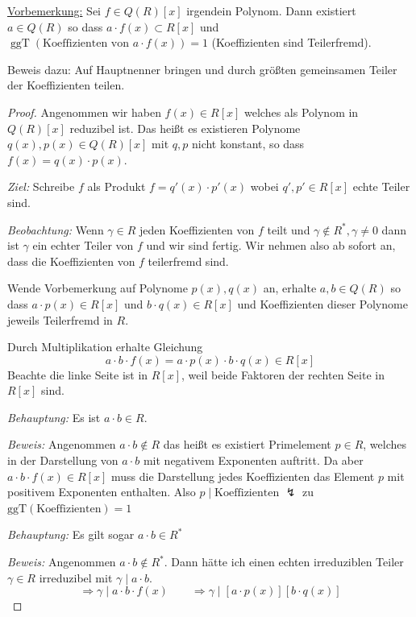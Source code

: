 \documentclass[12pt,parskip=full]{scrartcl}
\newcommand{\heading}{\underline}
\theoremstyle{definition}
\theoremstyle{remark}
\begin{document}
	\heading{Vorbemerkung:} Sei $f \in Q(R)[x]$ irgendein Polynom. Dann existiert $a \in Q(R)$ so dass $a \cdot f(x) \subset R[x]$ und $\operatorname{ggT}(\text{Koeffizienten von } a \cdot f(x)) = 1$ (Koeffizienten sind Teilerfremd).
	
	Beweis dazu: Auf Hauptnenner bringen und durch größten gemeinsamen Teiler der Koeffizienten teilen.
	
	\begin{proof}
		Angenommen wir haben $f(x) \in R[x]$ welches als Polynom in $Q(R)[x]$ reduzibel ist. Das heißt es existieren Polynome $q(x), p(x) \in Q(R)[x]$ mit $q,p$ nicht konstant, so dass $f(x) = q(x) \cdot p(x)$.
		
		\textit{Ziel:} Schreibe $f$ als Produkt $f = q'(x) \cdot p'(x)$ wobei $q',p' \in R[x]$ echte Teiler sind.
		
		\textit{Beobachtung:} Wenn $\gamma \in R$ jeden Koeffizienten von $f$ teilt und $\gamma \notin R^*, \gamma \neq 0$ dann ist $\gamma$ ein echter Teiler von $f$ und wir sind fertig. Wir nehmen also ab sofort an, dass die Koeffizienten von $f$ teilerfremd sind.
		
		Wende Vorbemerkung auf Polynome $p(x), q(x)$ an, erhalte $a,b \in Q(R)$ so dass $a \cdot p(x) \in R[x]$ und $b \cdot q(x) \in R[x]$ und Koeffizienten dieser Polynome jeweils Teilerfremd in $R$.
		
		Durch Multiplikation erhalte Gleichung
		\begin{equation*}
			a \cdot b \cdot f(x) = a \cdot p(x) \cdot b \cdot q(x) \in R[x] \tag{$*$}
		\end{equation*}
		Beachte die linke Seite ist in $R[x]$, weil beide Faktoren der rechten Seite in $R[x]$ sind.
		
		\textit{Behauptung:} Es ist $a \cdot b \in R$.
		
		\textit{Beweis:} Angenommen $a \cdot b \notin R$ das heißt es existiert Primelement $p \in R$, welches in der Darstellung von $a \cdot b$ mit negativem Exponenten auftritt. Da aber $a \cdot b \cdot f(x) \in R[x]$ muss die Darstellung jedes Koeffizienten das Element $p$ mit positivem Exponenten enthalten. Also $p \mid \text{Koeffizienten}$ $\lightning$ zu $\operatorname{ggT(\text{Koeffizienten})} = 1$
		
		\textit{Behauptung:} Es gilt sogar $a \cdot b \in R^*$
		
		\textit{Beweis:} Angenommen $a \cdot b \notin R^*$. Dann hätte ich einen echten irreduziblen Teiler $\gamma \in R$ irreduzibel mit $\gamma \mid a \cdot b$.
		\begin{equation*}
			\Rightarrow \gamma \mid a \cdot b \cdot f(x) \qquad \Rightarrow \gamma \mid [a \cdot p(x)][b \cdot q(x)]
		\end{equation*}
		

\end{proof}
\end{document}
